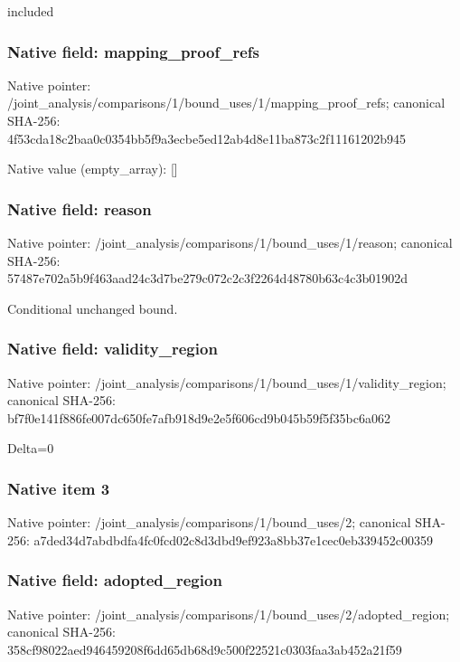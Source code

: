 \documentclass[10pt,a4paper]{article}
\begin{document}
\begingroup\raggedright\sloppy included\par\endgroup

\subsubsection{Native field: mapping\_\allowbreak{}proof\_\allowbreak{}refs}
Native pointer: /joint\_\allowbreak{}analysis/comparisons/1/bound\_\allowbreak{}uses/1/mapping\_\allowbreak{}proof\_\allowbreak{}refs; canonical SHA-256: 4f53cda18c2baa0c0354bb5f9a3ecbe5ed12ab4d8e11ba873c2f11161202b945

Native value (empty\_\allowbreak{}array): []

\subsubsection{Native field: reason}
Native pointer: /joint\_\allowbreak{}analysis/comparisons/1/bound\_\allowbreak{}uses/1/reason; canonical SHA-256: 57487e702a5b9f463aad24c3d7be279c072c2c3f2264d48780b63c4c3b01902d

\begingroup\raggedright\sloppy Conditional unchanged bound.\par\endgroup

\subsubsection{Native field: validity\_\allowbreak{}region}
Native pointer: /joint\_\allowbreak{}analysis/comparisons/1/bound\_\allowbreak{}uses/1/validity\_\allowbreak{}region; canonical SHA-256: bf7f0e141f886fe007dc650fe7afb918d9e2e5f606cd9b045b59f5f35bc6a062

\begingroup\raggedright\sloppy Delta=\allowbreak{}0\par\endgroup

\subsubsection{Native item 3}
Native pointer: /joint\_\allowbreak{}analysis/comparisons/1/bound\_\allowbreak{}uses/2; canonical SHA-256: a7ded34d7abdbdfa4fc0fcd02c8d3dbd9ef923a8bb37e1cec0eb339452c00359

\subsubsection{Native field: adopted\_\allowbreak{}region}
Native pointer: /joint\_\allowbreak{}analysis/comparisons/1/bound\_\allowbreak{}uses/2/adopted\_\allowbreak{}region; canonical SHA-256: 358cf98022aed946459208f6dd65db68d9c500f22521c0303faa3ab452a21f59
\end{document}
